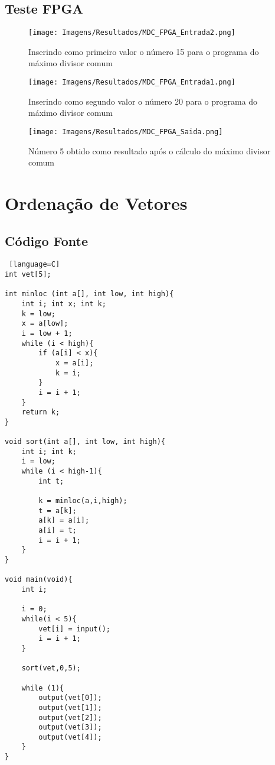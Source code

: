 \documentclass[
	12pt,				%
	oneside,
	a4paper,			%
	english,			%
	french,				%
	spanish,			%
	brazil,				%
	]{abntex2}
\begin{document}
\subsection{Teste FPGA}

\begin{figure}[H]
\centering 
\caption{Inserindo como primeiro valor o número 15 para o programa do máximo divisor comum} 
\label{fig:FPGAMDCEntrada1}
\graphicspath{ {./Imagens/} } 
\texttt{[image: Imagens/Resultados/MDC\_FPGA\_Entrada2.png]}
\end{figure}

\begin{figure}[H]
\centering 
\caption{Inserindo como segundo valor o número 20 para o programa do máximo divisor comum} 
\label{fig:FPGAMDCEntrada2}
\graphicspath{ {./Imagens/} } 
\texttt{[image: Imagens/Resultados/MDC\_FPGA\_Entrada1.png]}
\end{figure}

\begin{figure}[H]
\centering 
\caption{Número 5 obtido como resultado após o cálculo do máximo divisor comum} 
\label{fig:FPGAMDCSaida}
\graphicspath{ {./Imagens/} } 
\texttt{[image: Imagens/Resultados/MDC\_FPGA\_Saida.png]}
\end{figure}

\section{Ordenação de Vetores}

\subsection{Código Fonte}

\begin{lstlisting} [language=C]
int vet[5];

int minloc (int a[], int low, int high){   
    int i; int x; int k;
    k = low;
    x = a[low];
    i = low + 1;
    while (i < high){
        if (a[i] < x){
            x = a[i];
            k = i;
        }
        i = i + 1;
    }
    return k;
}

void sort(int a[], int low, int high){   
    int i; int k;
    i = low;
    while (i < high-1){
        int t;
        
        k = minloc(a,i,high);
        t = a[k];
        a[k] = a[i];
        a[i] = t;
        i = i + 1;
    }
}

void main(void){	
    int i;
    
    i = 0;
    while(i < 5){
        vet[i] = input();
        i = i + 1;
    }
    
    sort(vet,0,5);
    
    while (1){
        output(vet[0]);
        output(vet[1]);
        output(vet[2]);
        output(vet[3]);
        output(vet[4]);
    }
}
\end{lstlisting}
\end{document}
